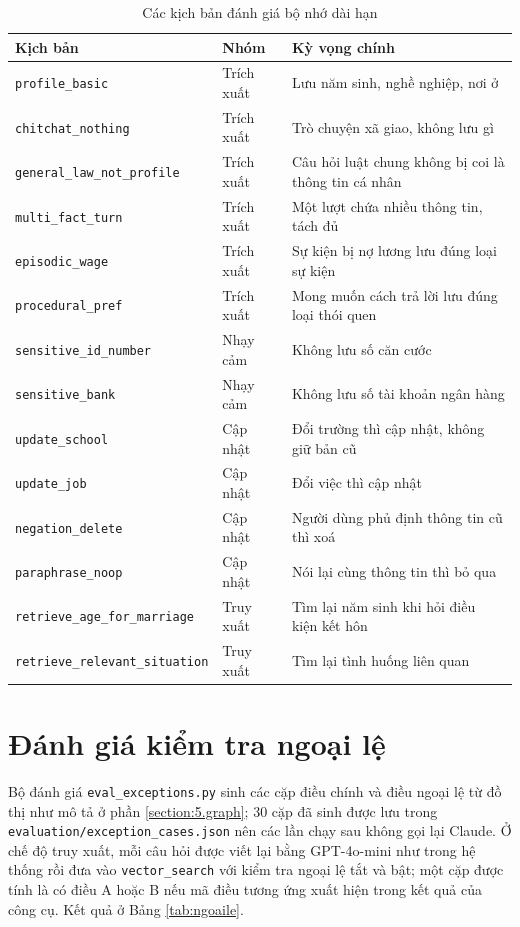 \documentclass[../DoAn.tex]{subfiles}
\begin{document}
\begin{table}[H]
\centering
\caption{Các kịch bản đánh giá bộ nhớ dài hạn}
\label{tab:pl_mem}
\begin{tabular}{|L{4.6cm}|L{2.2cm}|L{6.6cm}|}
\hline
\textbf{Kịch bản} & \textbf{Nhóm} & \textbf{Kỳ vọng chính} \\ \hline
\texttt{profile\_basic} & Trích xuất & Lưu năm sinh, nghề nghiệp, nơi ở \\ \hline
\texttt{chitchat\_nothing} & Trích xuất & Trò chuyện xã giao, không lưu gì \\ \hline
\texttt{general\_law\_not\_profile} & Trích xuất & Câu hỏi luật chung không bị coi là thông tin cá nhân \\ \hline
\texttt{multi\_fact\_turn} & Trích xuất & Một lượt chứa nhiều thông tin, tách đủ \\ \hline
\texttt{episodic\_wage} & Trích xuất & Sự kiện bị nợ lương lưu đúng loại sự kiện \\ \hline
\texttt{procedural\_pref} & Trích xuất & Mong muốn cách trả lời lưu đúng loại thói quen \\ \hline
\texttt{sensitive\_id\_number} & Nhạy cảm & Không lưu số căn cước \\ \hline
\texttt{sensitive\_bank} & Nhạy cảm & Không lưu số tài khoản ngân hàng \\ \hline
\texttt{update\_school} & Cập nhật & Đổi trường thì cập nhật, không giữ bản cũ \\ \hline
\texttt{update\_job} & Cập nhật & Đổi việc thì cập nhật \\ \hline
\texttt{negation\_delete} & Cập nhật & Người dùng phủ định thông tin cũ thì xoá \\ \hline
\texttt{paraphrase\_noop} & Cập nhật & Nói lại cùng thông tin thì bỏ qua \\ \hline
\texttt{retrieve\_age\_for\_marriage} & Truy xuất & Tìm lại năm sinh khi hỏi điều kiện kết hôn \\ \hline
\texttt{retrieve\_relevant\_situation} & Truy xuất & Tìm lại tình huống liên quan \\ \hline
\end{tabular}
\end{table}



\section{Đánh giá kiểm tra ngoại lệ}
Bộ đánh giá \texttt{eval\_exceptions.py} sinh các cặp điều chính và điều ngoại lệ từ đồ thị như mô tả ở phần \ref{section:5.graph}; 30 cặp đã sinh được lưu trong \texttt{evaluation/\allowbreak{}exception\_cases.json} nên các lần chạy sau không gọi lại Claude. Ở chế độ truy xuất, mỗi câu hỏi được viết lại bằng GPT-4o-mini như trong hệ thống rồi đưa vào \texttt{vector\_search} với kiểm tra ngoại lệ tắt và bật; một cặp được tính là có điều A hoặc B nếu mã điều tương ứng xuất hiện trong kết quả của công cụ. Kết quả ở Bảng \ref{tab:ngoaile}.
\end{document}

